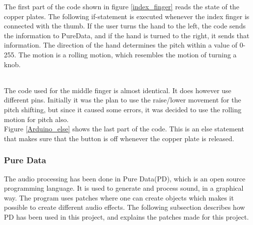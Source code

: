 The first part of the code shown in figure \ref{index_finger} reads the state of the copper plates. The following if-statement is executed whenever the index finger is connected with the thumb. 
If the user turns the hand to the left, the code sends the information to PureData, and if the hand is turned to the right, it sends that information. 
The direction of the hand determines the pitch within a value of 0-255. The motion is a rolling motion, which resembles the motion of turning a knob. \\


\begin{minipage}{\linewidth}%
\label{index_finger}
\end{minipage}\\

The code used for the middle finger is almost identical. It does however use different pins. Initially it was the plan to use the raise/lower movement for the pitch shifting, but since it caused some errors, it was decided to use the rolling motion for pitch also.\\

Figure \ref{Arduino_else} shows the last part of the code. This is an else statement that makes sure that the button is off whenever the copper plate is released. 

\begin{minipage}{\linewidth}%
\label{Arduino_else}
\end{minipage}


\subsubsection{Pure Data}

The audio processing has been done in Pure Data(PD)\citep{PD_Info}, which is an open source programming language. It is used to generate and process sound, in a graphical way. 
The program uses patches where one can create objects which makes it possible to create different audio effects. The following subsection describes how PD has been used in this project, and explains the patches made for this project. \\

